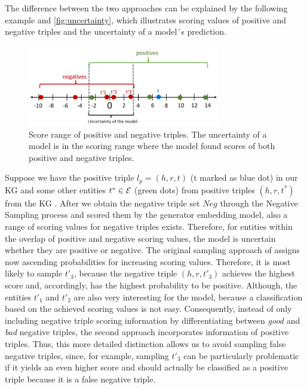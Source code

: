 The difference between the two approaches can be explained by the following example and \autoref{fig:uncertainty}, which illustrates scoring values of positive and negative triples and the uncertainty of a model´s prediction.
\begin{figure}[t]
  \centering
    \includegraphics[width=0.75\textwidth]{figures/uncertainty.PNG}
  \caption{Score range of positive and negative triples.
  The uncertainty of a model is in the scoring range where the model found scores of both positive and negative triples.}
  \label{fig:uncertainty}
\end{figure}
Suppose we have the positive triple $l_p=(h,r,t)$ (t marked as blue dot) in our KG and some other entities $t^* \in \mathcal{E}$ (green dots) from positive triples $(h,r,t^*)$ from the \ac{KG} .
After we obtain the negative triple set $Neg$ through the Negative Sampling process and scored them by the generator embedding model, also a range of scoring values for negative triples exists. 
Therefore, for entities within the overlap of positive and negative scoring values, the model is uncertain whether they are positive or negative.
The original sampling approach of \kbgan assigns now ascending probabilities for increasing scoring values.
Therefore, it is most likely to sample $t'_3$, because the negative triple $(h,r,t'_3)$ achieves the highest score and, accordingly, has the highest probability to be positive.
Although, the entities $t'_1$ and $t'_2$ are also very interesting for the model, because a classification based on the achieved scoring values is not easy.
Consequently, instead of only including negative triple scoring information by differentiating between \textit{good} and \textit{bad} negative triples, the second approach incorporates information of positive triples.
Thus, this more detailed distinction allows us to avoid sampling false negative triples, since, for example, sampling $t'_3$ can be particularly problematic if it yields an even higher score and should actually be classified as a positive triple because it is a false negative triple.
